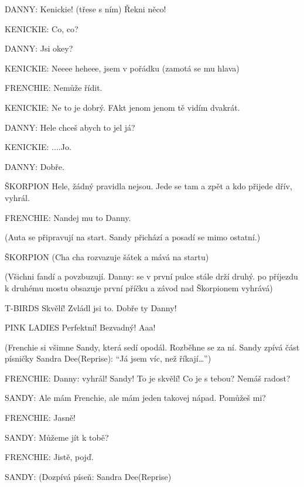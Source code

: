\rep DANNY:        Kenickie! (třese s ním) Řekni něco!

\rep KENICKIE:         Co, co? 

\rep DANNY:        Jsi okey? 

\rep KENICKIE:        Neeee heheee, jsem v pořádku (zamotá se mu hlava) 

\rep FRENCHIE:        Nemůže řídit. 

\rep KENICKIE:         Ne to je dobrý. FAkt jenom jenom tě vidím dvakrát. 

\rep DANNY:        Hele chceš abych to jel já? 

\rep KENICKIE:        ....Jo.

\rep DANNY:        Dobře. 

ŠKORPION        Hele, žádný pravidla nejsou. Jede se tam a zpět a kdo přijede dřív,         vyhrál. 

\rep FRENCHIE:        Nandej mu to Danny. 

(Auta se připravují na start. Sandy přichází a posadí se mimo ostatní.)

ŠKORPION         (Cha cha rozvazuje šátek a mává na startu)

                (Všichni fandí a povzbuzují. \rep Danny: se v první pulce stále drží druhý.                po příjezdu k druhému mostu obsazuje první příčku a závod nad                 Škorpionem vyhrává)

T-BIRDS        Skvělí! Zvládl jsi to. Dobře ty Danny!

PINK LADIES        Perfektní! Bezvadný! Aaa!





(Frenchie si všimne Sandy, která sedí opodál. Rozběhne se za ní. Sandy zpívá část písničky Sandra Dee(Reprise): “Já jsem víc, než říkají…”)





\rep FRENCHIE:        \rep Danny: vyhrál! Sandy! To je skvělí! Co je s tebou? Nemáš radost?

\rep SANDY:        Ale mám Frenchie, ale mám jeden takovej nápad. Pomůžeš mi? 

\rep FRENCHIE:        Jasně! 

\rep SANDY:        Můžeme jít k tobě? 

\rep FRENCHIE:        Jistě, pojď. 

\rep SANDY:        (Dozpívá píseň: Sandra Dee(Reprise)









